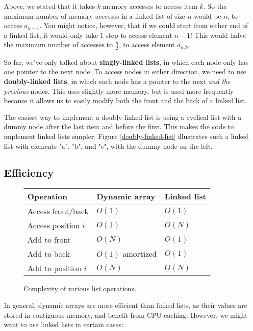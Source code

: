 Above, we stated that it takes $k$ memory accesses to access item $k$. So the maximum number of memory accesses in a linked list of size $n$ would be $n$, to access $a_{n-1}$. You might notice, however, that if we could start from either end of a linked list, it would only take $1$ step to access element $n-1$! This would halve the maximum number of accesses to $\frac{n}{2}$, to access element $a_{n/2}$.

So far, we've only talked about \textbf{singly-linked lists}, in which each node only has one pointer to the next node. To access nodes in either direction, we need to use \textbf{doubly-linked lists}, in which each node has a pointer to the next \textit{and the previous} nodes. This uses slightly more memory, but is used more frequently because it allows us to easily modify both the front and the back of a linked list.

The easiest way to implement a doubly-linked list is using a cyclical list with a dummy node after the last item and before the first. This makes the code to implement linked lists simpler. Figure \ref{doubly-linked-list} illustrates such a linked list with elements "a", "b", and "c", with the dummy node on the left.


\subsection{Efficiency}

\begin{figure}[b]
\centering
\begin{tabular}{| l | l | l |} \hline
    \textbf{Operation}           & \textbf{Dynamic array}    & \textbf{Linked list}  \\ \hline
    Access front/back   & $O(1)$           & $O(1)$       \\ \hline
    Access position $i$ & $O(1)$           & $O(N)$       \\ \hline
    Add to front        & $O(N)$           & $O(1)$       \\ \hline
    Add to back         & $O(1)$ amortized & $O(1)$       \\ \hline
    Add to position $i$ & $O(N)$           & $O(N)$       \\ \hline
\end{tabular}
\caption{Complexity of various list operations.}
\end{figure}

In general, dynamic arrays are more efficient than linked lists, as their values are stored in contiguous memory, and benefit from CPU caching. However, we might want to use linked lists in certain cases:


